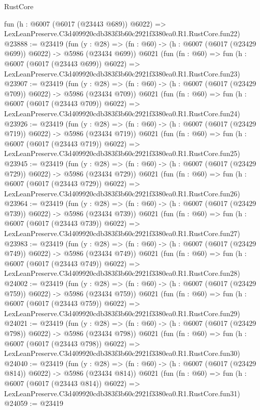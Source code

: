 \begin{lexlean}{RustCore}
\begin{coremodule}
    fun (h : @6007 (@6017 (@23443 @689)) @6022) =>
    LexLeanPreserve.C3d409920cdb383f3b60c2921f3380ea0.R1.RustCore.fun22)
@23888 := @23419
    (fun (y : @28) => (fn : @60) -> (h : @6007 (@6017 (@23429 @699)) @6022) -> @5986 (@23434 @699))
    @6021
    (fun (fn : @60) =>
    fun (h : @6007 (@6017 (@23443 @699)) @6022) =>
    LexLeanPreserve.C3d409920cdb383f3b60c2921f3380ea0.R1.RustCore.fun23)
@23907 := @23419
    (fun (y : @28) => (fn : @60) -> (h : @6007 (@6017 (@23429 @709)) @6022) -> @5986 (@23434 @709))
    @6021
    (fun (fn : @60) =>
    fun (h : @6007 (@6017 (@23443 @709)) @6022) =>
    LexLeanPreserve.C3d409920cdb383f3b60c2921f3380ea0.R1.RustCore.fun24)
@23926 := @23419
    (fun (y : @28) => (fn : @60) -> (h : @6007 (@6017 (@23429 @719)) @6022) -> @5986 (@23434 @719))
    @6021
    (fun (fn : @60) =>
    fun (h : @6007 (@6017 (@23443 @719)) @6022) =>
    LexLeanPreserve.C3d409920cdb383f3b60c2921f3380ea0.R1.RustCore.fun25)
@23945 := @23419
    (fun (y : @28) => (fn : @60) -> (h : @6007 (@6017 (@23429 @729)) @6022) -> @5986 (@23434 @729))
    @6021
    (fun (fn : @60) =>
    fun (h : @6007 (@6017 (@23443 @729)) @6022) =>
    LexLeanPreserve.C3d409920cdb383f3b60c2921f3380ea0.R1.RustCore.fun26)
@23964 := @23419
    (fun (y : @28) => (fn : @60) -> (h : @6007 (@6017 (@23429 @739)) @6022) -> @5986 (@23434 @739))
    @6021
    (fun (fn : @60) =>
    fun (h : @6007 (@6017 (@23443 @739)) @6022) =>
    LexLeanPreserve.C3d409920cdb383f3b60c2921f3380ea0.R1.RustCore.fun27)
@23983 := @23419
    (fun (y : @28) => (fn : @60) -> (h : @6007 (@6017 (@23429 @749)) @6022) -> @5986 (@23434 @749))
    @6021
    (fun (fn : @60) =>
    fun (h : @6007 (@6017 (@23443 @749)) @6022) =>
    LexLeanPreserve.C3d409920cdb383f3b60c2921f3380ea0.R1.RustCore.fun28)
@24002 := @23419
    (fun (y : @28) => (fn : @60) -> (h : @6007 (@6017 (@23429 @759)) @6022) -> @5986 (@23434 @759))
    @6021
    (fun (fn : @60) =>
    fun (h : @6007 (@6017 (@23443 @759)) @6022) =>
    LexLeanPreserve.C3d409920cdb383f3b60c2921f3380ea0.R1.RustCore.fun29)
@24021 := @23419
    (fun (y : @28) => (fn : @60) -> (h : @6007 (@6017 (@23429 @798)) @6022) -> @5986 (@23434 @798))
    @6021
    (fun (fn : @60) =>
    fun (h : @6007 (@6017 (@23443 @798)) @6022) =>
    LexLeanPreserve.C3d409920cdb383f3b60c2921f3380ea0.R1.RustCore.fun30)
@24040 := @23419
    (fun (y : @28) => (fn : @60) -> (h : @6007 (@6017 (@23429 @814)) @6022) -> @5986 (@23434 @814))
    @6021
    (fun (fn : @60) =>
    fun (h : @6007 (@6017 (@23443 @814)) @6022) =>
    LexLeanPreserve.C3d409920cdb383f3b60c2921f3380ea0.R1.RustCore.fun31)
@24059 := @23419

\end{coremodule}
\end{lexlean}
